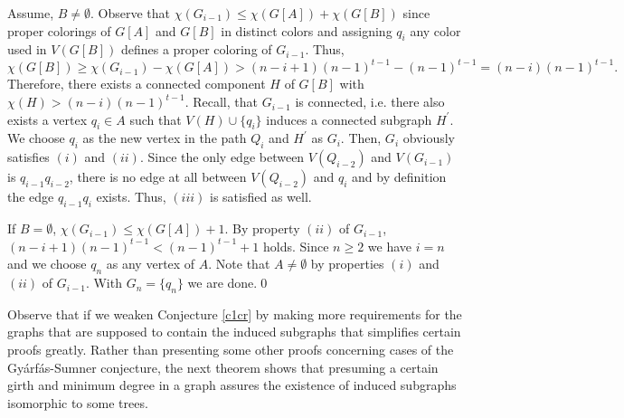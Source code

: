 \begin{prf}
Assume, $B\neq\emptyset$. Observe that $\chi (G_{i-1})\leq \chi (G[A]) + \chi (G[B])$ since proper colorings of $G[A]$ and $G[B]$ in distinct colors and assigning $q_i$ any color used in $V(G[B])$ defines a proper coloring of $G_{i-1}$. Thus, \[\chi (G[B])\geq \chi (G_{i-1})-\chi (G[A])>(n-i+1)(n-1)^{t-1}-(n-1)^{t-1}=(n-i)(n-1)^{t-1}.\]
Therefore, there exists a connected component $H$ of $G[B]$ with $\chi (H)>(n-i)(n-1)^{t-1}$. Recall, that $G_{i-1}$ is connected, i.e. there also exists a vertex $q_i\in A$ such that $V(H)\cup \{q_i\}$ induces a connected subgraph $H^\prime$. We choose $q_i$ as the new vertex in the path $Q_i$ and $H^\prime$ as $G_i$. Then, $G_i$ obviously satisfies $(i)$ and $(ii)$. Since the only edge between $V(Q_{i-2})$ and $V(G_{i-1})$ is $q_{i-1}q_{i-2}$, there is no edge at all between $V(Q_{i-2})$ and $q_i$ and by definition the edge $q_{i-1}q_i$ exists. Thus, $(iii)$ is satisfied as well. 

If $B=\emptyset$, $\chi (G_{i-1})\leq \chi (G[A]) + 1$. By property $(ii)$ of $G_{i-1}$, $(n-i+1)(n-1)^{t-1} < (n-1)^{t-1} +1$ holds. Since $n\geq 2$ we have $i=n$ and we choose $q_n$ as any vertex of $A$. Note that $A\neq\emptyset$ by properties $(i)$ and $(ii)$ of $G_{i-1}$. With $G_n=\{q_n\}$ we are done.\qed
\end{prf}


Observe that if we weaken Conjecture \ref{c1cr} by making more requirements for the graphs that are supposed to contain the induced subgraphs that simplifies certain proofs greatly. Rather than presenting some other proofs concerning cases of the Gyárfás-Sumner conjecture, the next theorem shows that presuming a certain girth and minimum degree in a graph assures the existence of induced subgraphs isomorphic to some trees. 

